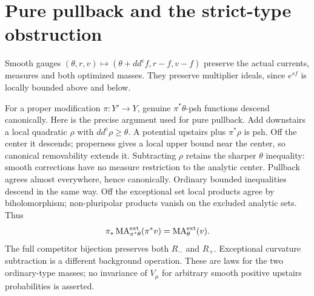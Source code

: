 \documentclass[11pt]{article}
\theoremstyle{remark}
\newcommand{\ddc}{dd^{\mathrm c}}
\newcommand{\MA}{\operatorname{MA}}
\begin{document}
\section{Pure pullback and the strict-type obstruction}
Smooth gauges $(\theta,r,v)\mapsto(\theta+\ddc f,r-f,v-f)$ preserve
the actual currents, measures and both optimized masses. They preserve
multiplier ideals, since $e^{sf}$ is locally bounded above and below.

For a proper modification $\pi:Y'\to Y$, genuine
$\pi^*\theta$-psh functions descend canonically. Here is the precise
argument used for pure pullback. Add downstairs a local quadratic
$\rho$ with $\ddc\rho\geq\theta$. A potential upstairs plus
$\pi^*\rho$ is psh. Off the center it descends; properness gives a local
upper bound near the center, so canonical removability extends it.
Subtracting $\rho$ retains the sharper $\theta$ inequality: smooth
corrections have no measure restriction to the analytic center.
Pullback agrees almost everywhere, hence canonically. Ordinary bounded
inequalities descend in the same way. Off the exceptional set local
products agree by biholomorphism; non-pluripolar products vanish on the
excluded analytic sets. Thus
\[
 \pi_*\MA^{\rm ext}_{\pi^*\theta}(\pi^*v)=\MA^{\rm ext}_\theta(v).
\]
The full competitor bijection preserves both $R_-$ and $R_+$.
Exceptional curvature subtraction is a different background operation.
These are laws for the two ordinary-type masses; no invariance of
$V_\mu$ for arbitrary smooth positive upstairs probabilities is asserted.
\end{document}

